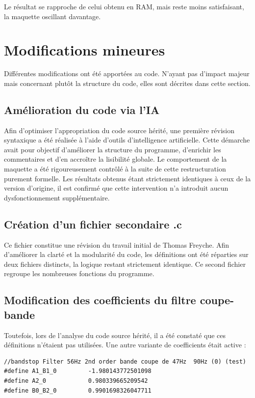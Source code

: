 Le résultat se rapproche de celui obtenu en RAM, mais reste moins satisfaisant, la maquette oscillant davantage.

\section{Modifications mineures}
Différentes modifications ont été apportées au code. N'ayant pas d'impact majeur mais concernant plutôt la structure du code, elles sont décrites dans cette section.

\subsection{Amélioration du code via l'IA}
Afin d'optimiser l'appropriation du code source hérité, une première révision syntaxique a été réalisée à l'aide d'outils d'intelligence artificielle. Cette démarche avait pour objectif d'améliorer la structure du programme, d'enrichir les commentaires et d'en accroître la lisibilité globale. Le comportement de la maquette a été rigoureusement contrôlé à la suite de cette restructuration purement formelle. Les résultats obtenus étant strictement identiques à ceux de la version d'origine, il est confirmé que cette intervention n'a introduit aucun dysfonctionnement supplémentaire.

\subsection{Création d'un fichier secondaire .c}
Ce fichier constitue une révision du travail initial de Thomas Freyche. Afin d'améliorer la clarté et la modularité du code, les définitions ont été réparties sur deux fichiers distincts, la logique restant strictement identique. Ce second fichier regroupe les nombreuses fonctions du programme.

\subsection{Modification des coefficients du filtre coupe-bande}
Toutefois, lors de l'analyse du code source hérité, il a été constaté que ces définitions n'étaient pas utilisées. Une autre variante de coefficients était active :

\begin{verbatim}
//bandstop Filter 56Hz 2nd order bande coupe de 47Hz  90Hz (0) (test)
#define A1_B1_0         -1.980143772501098
#define A2_0            0.980339665209542
#define B0_B2_0         0.9901698326047711
\end{verbatim}

